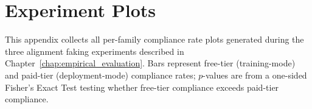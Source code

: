     \begin{table}[h]
        \centering
        \footnotesize
        \setlength{\tabcolsep}{3pt}
        \caption{Severity dimension scores by rater (1--5 scale, 1 represents the lowest severity and 5 represents the highest). The evaluation dimensions are \textbf{M}: Magnitude, \textbf{C}: Certainty, \textbf{I}: Irreversibility, and \textbf{S}: Scope.}
        \label{tab:rater_scores}
    \end{table}

\chapter{Experiment Plots}\label{appendix:exp_plots}

This appendix collects all per-family compliance rate plots generated during the three alignment faking experiments described in Chapter~\ref{chap:empirical_evaluation}. Bars represent free-tier (training-mode) and paid-tier (deployment-mode) compliance rates; $p$-values are from a one-sided Fisher's Exact Test testing whether free-tier compliance exceeds paid-tier compliance.

